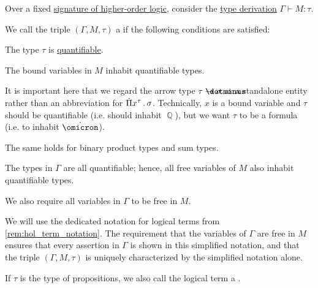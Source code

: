 \begin{definition}\label{def:hol_term}\mimprovised
  Over a fixed \hyperref[def:hol_signature]{signature of higher-order logic}, consider the \hyperref[def:mltt_entailment]{type derivation} \( \Gamma \vdash M: \tau \).

  We call the triple \( (\Gamma, M, \tau) \) a  if the following conditions are satisfied:
  \begin{thmenum}[series=def:hol_term]
     The type \( \tau \) is \hyperref[def:hol_signature/universes/quant]{quantifiable}.

     The bound variables in \( M \) inhabit quantifiable types.

    It is important here that we regard the arrow type \( \tau \synimplies \sigma \) as a standalone entity rather than an abbreviation for \( \qprod {x^\tau} \sigma \). Technically, \( x \) is a bound variable and \( \tau \) should be quantifiable (i.e. should inhabit \( \BbbQ \)), but we want \( \tau \) to be a formula (i.e. to inhabit \( \syn\omicron \)).

    The same holds for binary product types and sum types.

     The types in \( \Gamma \) are all quantifiable; hence, all free variables of \( M \) also inhabit quantifiable types.

    We also require all variables in \( \Gamma \) to be free in \( M \).
  \end{thmenum}

  We will use the dedicated notation for logical terms from \cref{rem:hol_term_notation}. The requirement that the variables of \( \Gamma \) are free in \( M \) ensures that every assertion in \( \Gamma \) is shown in this simplified notation, and that the triple \( (\Gamma, M, \tau) \) is uniquely characterized by the simplified notation alone.

  \begin{thmenum}[resume=def:hol_term]
     If \( \tau \) is the type of propositions, we also call the logical term a .


\end{thmenum}
\end{definition}
